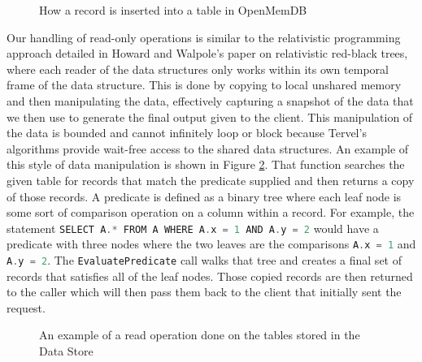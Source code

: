 \documentclass[letter,11pt]{article}
\let\oldReturn\Return
\renewcommand{\Return}{\State\oldReturn}
\newcommand{\inlinecode}[1]{\colorbox{codegrey}{\lstinline[language=C++]{#1}}}
\begin{document}
\begin{figure}
 \begin{algorithmic}
 \EndIf
  \State{}
 \EndFor
 \State{}
 \EndFunction
 \end{algorithmic}
 \caption{How a record is inserted into a table in OpenMemDB}
 \label{insert_record}
\end{figure}

\par\vspace{\baselineskip}
Our handling of read-only operations is similar to the relativistic programming approach detailed 
in Howard and Walpole's paper on relativistic red-black trees, where each reader of the 
data structures only works within its own temporal frame of the data structure\cite{rbtree}. 
This is done by copying to local unshared memory and then manipulating the data, 
effectively capturing a snapshot of the data that we then use to generate the final 
output given to the client. This manipulation of the data is bounded and cannot 
infinitely loop or block because Tervel's algorithms provide wait-free access 
to the shared data structures. An example of this style of data manipulation is shown in 
Figure \ref{read_op}. That function searches the given table for records that match
the predicate supplied and then returns a copy of those records. A predicate is defined
as a binary tree where each leaf node is some sort of comparison operation on a column
within a record. For example, the statement \inlinecode{SELECT A.* FROM A WHERE A.x = 1 AND A.y = 2}
would have a predicate with three nodes where the two leaves are the comparisons
\inlinecode{A.x = 1} and \inlinecode{A.y = 2}. The \inlinecode{EvaluatePredicate} call
walks that tree and creates a final set of records that satisfies all of the
leaf nodes. Those copied records are then returned to the caller which will then
pass them back to the client that initially sent the request.

\begin{figure}[h]
 \begin{algorithmic}
  \EndFor
 \Else
 \EndIf
 \EndFunction
 \end{algorithmic}
 \caption{An example of a read operation done on the tables stored in the Data Store}
 \label{read_op}
\end{figure}
\end{document}
